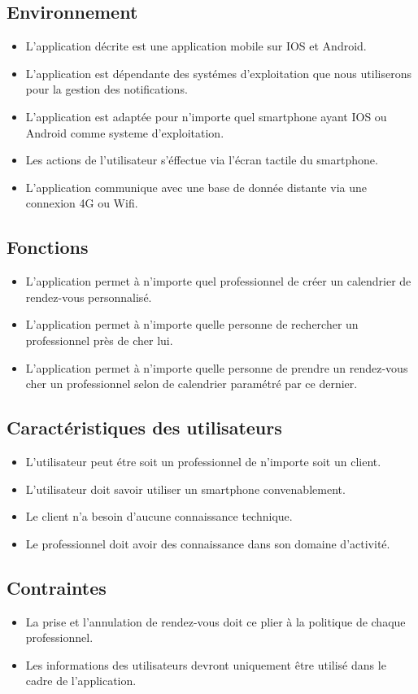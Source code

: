 \documentclass{article}
\begin{document}
\subsection{Environnement}
\begin{itemize}
\item L'application décrite est une application mobile sur IOS et
Android.
\item L'application est dépendante des systémes d'exploitation que
nous utiliserons pour la gestion des notifications.
\item L'application est adaptée pour n'importe quel smartphone ayant IOS ou Android comme
systeme d'exploitation.
\item Les actions de l'utilisateur s'éffectue via l'écran
  tactile du smartphone.
\item L'application communique avec une base de donnée distante
  via une connexion 4G ou Wifi.
\end{itemize}
\subsection{Fonctions}
\begin{itemize}
\item L'application permet à n'importe quel professionnel de créer un
calendrier de rendez-vous personnalisé.
\item L'application permet à n'importe quelle personne de rechercher un
  professionnel près de cher lui.
\item L'application permet à n'importe quelle personne de prendre un
  rendez-vous cher un professionnel selon de calendrier paramétré par
  ce dernier.
\end{itemize}
\subsection{Caractéristiques des utilisateurs}
\begin{itemize}
\item L'utilisateur peut étre soit un professionnel de n'importe soit
  un client.
\item L'utilisateur doit savoir utiliser un smartphone convenablement.
\item Le client n'a besoin d'aucune connaissance technique.
\item Le professionnel doit avoir des connaissance dans son domaine
  d'activité.
\end{itemize}
\subsection{Contraintes}
\begin{itemize}
\item La prise et l'annulation de rendez-vous doit ce plier à la
  politique de chaque professionnel.
\item Les informations des utilisateurs devront uniquement être
  utilisé dans le cadre de l'application.
\end{itemize}
\end{document}
